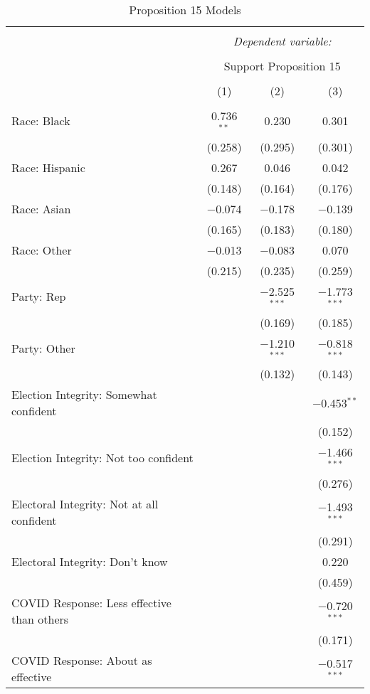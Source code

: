 
\begin{table}[!htbp] \centering 
  \caption{Proposition 15 Models} 
  \label{} 
\footnotesize 
\begin{tabular}{@{\extracolsep{5pt}}lccc} 
\\[-1.8ex]\hline 
\hline \\[-1.8ex] 
 & \multicolumn{3}{c}{\textit{Dependent variable:}} \\ 
\cline{2-4} 
\\[-1.8ex] & \multicolumn{3}{c}{Support Proposition 15} \\ 
\\[-1.8ex] & (1) & (2) & (3)\\ 
\hline \\[-1.8ex] 
 Race: Black & 0.736$^{**}$ & 0.230 & 0.301 \\ 
  & (0.258) & (0.295) & (0.301) \\ 
  Race: Hispanic & 0.267 & 0.046 & 0.042 \\ 
  & (0.148) & (0.164) & (0.176) \\ 
  Race: Asian & $-$0.074 & $-$0.178 & $-$0.139 \\ 
  & (0.165) & (0.183) & (0.180) \\ 
  Race: Other & $-$0.013 & $-$0.083 & 0.070 \\ 
  & (0.215) & (0.235) & (0.259) \\ 
  Party: Rep &  & $-$2.525$^{***}$ & $-$1.773$^{***}$ \\ 
  &  & (0.169) & (0.185) \\ 
  Party: Other &  & $-$1.210$^{***}$ & $-$0.818$^{***}$ \\ 
  &  & (0.132) & (0.143) \\ 
  Election Integrity: Somewhat confident &  &  & $-$0.453$^{**}$ \\ 
  &  &  & (0.152) \\ 
  Election Integrity: Not too confident &  &  & $-$1.466$^{***}$ \\ 
  &  &  & (0.276) \\ 
  Electoral Integrity: Not at all confident &  &  & $-$1.493$^{***}$ \\ 
  &  &  & (0.291) \\ 
  Electoral Integrity: Don't know &  &  & 0.220 \\ 
  &  &  & (0.459) \\ 
  COVID Response: Less effective than others &  &  & $-$0.720$^{***}$ \\ 
  &  &  & (0.171) \\ 
  COVID Response: About as effective &  &  & $-$0.517$^{***}$ \\ 

\end{tabular}
\end{table}
